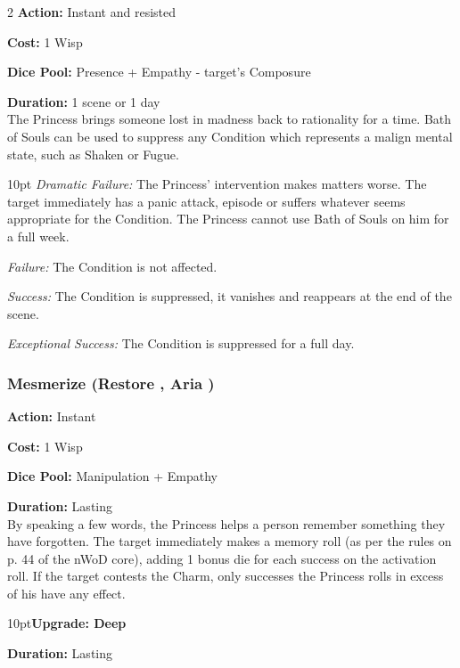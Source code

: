 \begin{multicols}{2}
\noindent \textbf{Action:} Instant and resisted

\noindent \textbf{Cost:} 1 Wisp

\noindent \textbf{Dice Pool:} Presence + Empathy - target's Composure

\noindent \textbf{Duration:} 1 scene or 1 day \\

\noindent The Princess brings someone lost in madness back to rationality for a time. Bath of Souls can be used to suppress any Condition which represents a malign mental state, such as Shaken or Fugue. 

\begin{myindentpar}{10pt}    \emph{Dramatic Failure:} The Princess' intervention makes matters worse. The target immediately has a panic attack, episode or suffers whatever seems appropriate for the Condition. The Princess cannot use Bath of Souls on him for a full week.

    \emph{Failure:} The Condition is not affected.

    \emph{Success:} The Condition is suppressed, it vanishes and reappears at the end of the scene.

    \emph{Exceptional Success:} The Condition is suppressed for a full day.

    \end{myindentpar}
	
\subsubsection*{Mesmerize (Restore \textbullet\textbullet, Aria \textbullet)}

\noindent \textbf{Action:} Instant

\noindent \textbf{Cost:} 1 Wisp

\noindent \textbf{Dice Pool:} Manipulation + Empathy

\noindent \textbf{Duration:} Lasting \\

\noindent By speaking a few words, the Princess helps a person remember something they have forgotten. The target immediately makes a memory roll (as per the rules on p. 44 of the nWoD core), adding 1 bonus die for each success on the activation roll. If the target contests the Charm, only successes the Princess rolls in excess of his have any effect.
\begin{myindentpar}{10pt}\textbf{Upgrade: Deep}

\noindent \textbf{Duration:} Lasting


\end{myindentpar}
\end{multicols}
